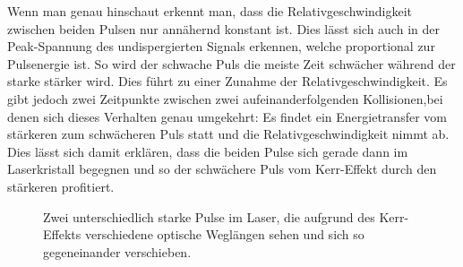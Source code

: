 \documentclass[bachelor,       %
               twoside,        %
               BCOR10mm,       %
               english,ngerman, %
               ]{GAUBM}
\begin{document}
Wenn man genau hinschaut erkennt man, dass die Relativgeschwindigkeit zwischen beiden Pulsen nur annähernd konstant ist.
Dies lässt sich auch in der Peak-Spannung des undispergierten Signals erkennen, welche proportional zur Pulsenergie ist.
So wird der schwache Puls die meiste Zeit schwächer während der starke stärker wird.
Dies führt zu einer Zunahme der Relativgeschwindigkeit.
Es gibt jedoch zwei Zeitpunkte zwischen zwei aufeinanderfolgenden Kollisionen,bei denen sich dieses Verhalten genau umgekehrt: Es findet ein Energietransfer vom stärkeren zum schwächeren Puls statt und die Relativgeschwindigkeit nimmt ab.
Dies lässt sich damit erklären, dass die beiden Pulse sich gerade dann im Laserkristall begegnen und so der schwächere Puls vom Kerr-Effekt durch den stärkeren profitiert.

\begin{figure}[!htb]
   \centering   
   \hfill
   \caption{Zwei unterschiedlich starke Pulse im Laser, die aufgrund des Kerr-Effekts verschiedene optische Weglängen sehen und sich so gegeneinander verschieben.}
   \label{fig:running441}
 \end{figure}
\end{document}
